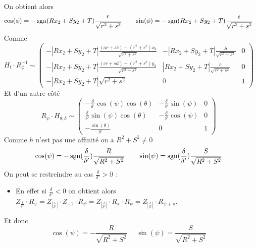 \begin{prop}
 On obtient alors 
 \begin{equation*}
 \cos( \phi )= -\operatorname{sgn}(R x_2 +S y_2 +T) \frac{r}{\sqrt{r^2 + s^2}}~~~~~~ \sin( \phi )= -\operatorname{sgn}(R x_2 +S y_2 +T) \frac{s}{\sqrt{r^2 + s^2}}
 \end{equation*}
 Comme 
 \begin{equation*}
H_t \cdot R_{\phi}^{-1} \sim
 \begin{pmatrix}
 -|R x_2 +S y_2 +T|\frac{(ar+sb)-(r^2 + s^2)x_2}{\sqrt{r^2 + s^2}}&-|R x_2 +S y_2 +T|\frac{S}{\sqrt{r^2 + s^2}}&0\\
 -|R x_2 +S y_2 +T|\frac{(cr+sd)-(r^2 + s^2)y_2}{\sqrt{r^2 + s^2}}&|R x_2 +S y_2 +T|\frac{r}{\sqrt{r^2 + s^2}}&0\\
 -|R x_2 +S y_2 +T|\sqrt{r^2 + s^2}&0&1
 \end{pmatrix}
 \end{equation*}
 Et d'un autre côté 
 \begin{equation*}
R_{\psi} \cdot H_{\theta,\delta}  \sim 
 \begin{pmatrix}
 -\frac{\delta}{\delta'}\cos(\psi)\cos(\theta)&
-\frac{\delta}{\delta'}\sin(\psi)&
0\\
\frac{\delta}{\delta'}\sin(\psi)\cos(\theta)&
-\frac{\delta}{\delta'}\cos(\psi)&
0\\
-\frac{\sin(\theta)}{\delta'}&
0&
1
 \end{pmatrix}
 \end{equation*}
Comme $h$ n'est pas une affinité on a $R^2 + S^2 \ne 0$ 
 \begin{equation*}
  \cos( \psi ) =- \operatorname{sgn}(\frac{\delta}{\delta'})\frac{R}{\sqrt{R^2 + S^2}}~~~~~~ \sin( \psi ) = \operatorname{sgn}(\frac{\delta}{\delta'})\frac{S}{\sqrt{R^2 + S^2}}
 \end{equation*}
On peut se restreindre au cas $\frac{\delta}{\delta'}>0$ :\\
\begin{itemize}
\item En effet si $\frac{\delta}{\delta'}<0$ on obtient alors $Z_{\frac{\delta}{\delta'}} \cdot R_{\psi}=Z_{\left|\frac{\delta}{\delta'}\right|}\cdot Z_{-1} \cdot R_{\psi}=Z_{\left|\frac{\delta}{\delta'}\right|}\cdot R_{\pi} \cdot R_{\psi}=Z_{\left|\frac{\delta}{\delta'}\right|}\cdot R_{\psi+\pi}$.
\end{itemize}
Et donc 
 \begin{equation*}
  \cos( \psi ) =- \frac{R}{\sqrt{R^2 + S^2}}~~~~~~ \sin( \psi ) = \frac{S}{\sqrt{R^2 + S^2}}
 \end{equation*}




\end{prop}
